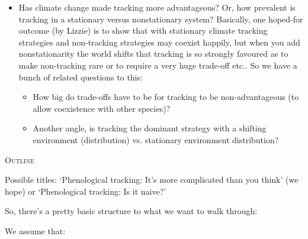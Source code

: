 \documentclass[11pt,letterpaper]{article}
\renewcommand{\section}[1]{%
\bigskip
\begin{center}
\begin{Large}
\normalfont\scshape #1
\medskip
\end{Large}
\end{center}}
\begin{document}
\begin{itemize}
\item Has climate change made tracking more advantageous? Or, how prevalent is tracking in a stationary versus nonstationary system? Basically, one hoped-for outcome (by Lizzie) is to show that with stationary climate tracking strategies and non-tracking strategies may coexist happily, but when you add nonstationarity the world shifts that tracking is so strongly favoured as to make non-tracking rare or to require a very huge trade-off etc.. So we have a bunch of related questions to this:
\begin{itemize}
\item How big do trade-offs have to be for tracking to be non-advantageous (to allow coexistence with other species)?
\item Another angle, is tracking the dominant strategy with a shifting environment (distribution) vs. stationary environment distribution?
\end{itemize}
\end{itemize}

\section{Outline}

\noindent Possible titles: `Phenological tracking: It's more complicated than you think' (we hope) or `Phenological tracking: Is it naive?'

So, there's a pretty basic structure to what we want to walk through:



\noindent We assume that:
\end{document}
